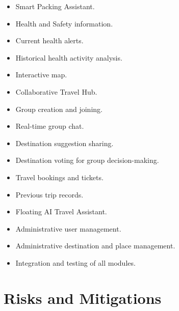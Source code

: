 \documentclass[11pt,a4paper]{article}
\begin{document}
\begin{itemize}

\item Smart Packing Assistant.

\item Health and Safety information.

\item Current health alerts.

\item Historical health activity analysis.

\item Interactive map.

\item Collaborative Travel Hub.

\item Group creation and joining.

\item Real-time group chat.

\item Destination suggestion sharing.

\item Destination voting for group decision-making.

\item Travel bookings and tickets.

\item Previous trip records.

\item Floating AI Travel Assistant.

\item Administrative user management.

\item Administrative destination and place management.

\item Integration and testing of all modules.

\end{itemize}



\section{Risks and Mitigations}
\end{document}

